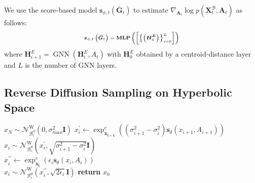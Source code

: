 \documentclass[letterpaper]{article} %
\begin{document}
We use the score-based model $\boldsymbol{s}_{\phi, t}(\boldsymbol{\bar{G}}_{t}) $ to estimate $\nabla_{\boldsymbol{A}_{t}} \log p\left(\boldsymbol{X}^\mathcal{B}_{t},\boldsymbol{A}_{t} \right)$ as follows:
\begin{equation}
\begin{scriptsize}
\boldsymbol{s}_{\phi, t}\left(\boldsymbol{\bar{G}}_{t}\right)=\operatorname{\textbf{MLP}}
\left(\left[\left\{\left(\boldsymbol{\boldsymbol{H}^E_{i}}\right)\right\}_{i=0}^{L}\right]\right)
\end{scriptsize}
\end{equation}
where $\boldsymbol{H}^E_{i+1} = \operatorname{\mathrm{GNN}}(\boldsymbol{H}^E_i,A_t)$ with $\boldsymbol{H}^E_0$ obtained by a centroid-distance layer and $L$ is the number of GNN layers.
\subsection{Reverse Diffusion Sampling on Hyperbolic Space}
\begin{algorithm}[t]
\caption{Hyperbolic PC sampling (VE SDE)}
\label{alg:algorithm1}
\begin{algorithmic}[1] %
\STATE $x_N\sim \mathcal{N}_{\mathcal{B}_{c}^{d}}^{\mathrm{W}}(0,\sigma^2_{max} \mathbf{I})$
\STATE $x^\prime_i \gets \exp _{\boldsymbol{x_{i+1}}}^{c}((\sigma^2_{i+1}-\sigma^2_i)\boldsymbol{s}_\theta(x_{i+1},A_{i+1}))$\\
\STATE $x_i\sim \mathcal{N}_{\mathcal{B}_{c}^{d}}^{\mathrm{W}}(x^\prime_i,\sqrt{\sigma^2_{i+1}-\sigma^2_i} \mathbf{I})$\\
\STATE $x^{\prime\prime}_i \gets  \exp _{\boldsymbol{x_{i}}}^{c}(\epsilon_i\boldsymbol{s}_\theta(x_{i},A_{i}))$ \\
\STATE $x_i \sim \mathcal{N}_{\mathcal{B}_{c}^{d}}^{\mathrm{W}}(x^{\prime\prime}_i,\sqrt{2\epsilon_i} \mathbf{I}) $
\ENDFOR
\ENDFOR
\STATE \textbf{return} $x_0$
\end{algorithmic}
\end{algorithm}
\end{document}
